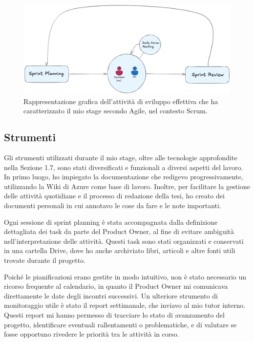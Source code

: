         \begin{figure}[H]
            \centering
            \includegraphics[width=0.7\linewidth]{BCS-Tessi/images/Sprint_true.png}
            \caption[Rappresentazione dell'attività di sviluppo effettiva secondo Agile (Scrum)]{Rappresentazione grafica dell'attività di sviluppo effettiva che ha caratterizzato il mio stage secondo Agile, nel contesto Scrum.}
            \label{fig:sprint-effettivi}
        \end{figure}
        
        \subsection{Strumenti}
        Gli strumenti utilizzati durante il mio stage, oltre alle tecnologie approfondite nella Sezione 1.7, sono stati diversificati e funzionali a diversi aspetti del lavoro. In primo luogo, ho impiegato la documentazione che redigevo progressivamente, utilizzando la Wiki di Azure come base di lavoro. Inoltre, per facilitare la gestione delle attività quotidiane e il processo di redazione della tesi, ho creato dei documenti personali in cui annotavo le cose da fare e le note importanti. 

        Ogni sessione di sprint planning è stata accompagnata dalla definizione dettagliata dei task da parte del Product Owner, al fine di evitare ambiguità nell’interpretazione delle attività. Questi task sono stati organizzati e conservati in una cartella Drive, dove ho anche archiviato libri, articoli e altre fonti utili trovate durante il progetto. 

        Poiché le pianificazioni erano gestite in modo intuitivo, non è stato necessario un ricorso frequente al calendario, in quanto il Product Owner mi comunicava direttamente le date degli incontri successivi. Un ulteriore strumento di monitoraggio utile è stato il report settimanale, che inviavo al mio tutor interno. Questi report mi hanno permesso di tracciare lo stato di avanzamento del progetto, identificare eventuali rallentamenti o problematiche, e di valutare se fosse opportuno rivedere le priorità tra le attività in corso.
        
